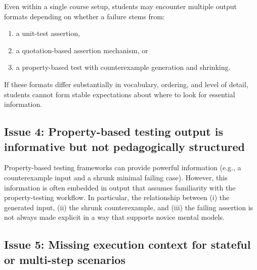 \begin{justify}
Even within a single course setup, students may encounter multiple output formats depending on
whether a failure stems from:

\skipS\begin{enumerate}[label={(\alph*)}]
    \item a unit-test assertion,
    \item a quotation-based assertion mechanism, or
    \item a property-based test with counterexample generation and shrinking.
\end{enumerate}

\skipS If these formats differ substantially in vocabulary, ordering, and level of detail, students
cannot form stable expectations about where to look for essential information.
\end{justify}


\subsection{Issue 4: Property-based testing output is informative but not pedagogically structured}
     \label{Issue 4: Property-based testing output is informative but not pedagogically structured}


\begin{justify}
Property-based testing frameworks can provide powerful information (e.g., a counterexample input and
a shrunk minimal failing case). However, this information is often embedded in output that assumes
familiarity with the property-testing workflow. In particular, the relationship between (i) the
generated input, (ii) the shrunk counterexample, and (iii) the failing assertion is not always made
explicit in a way that supports novice mental models.
\end{justify}


\subsection{Issue 5: Missing execution context for stateful or multi-step scenarios}
     \label{Issue 5: Missing execution context for stateful or multi-step scenarios}



